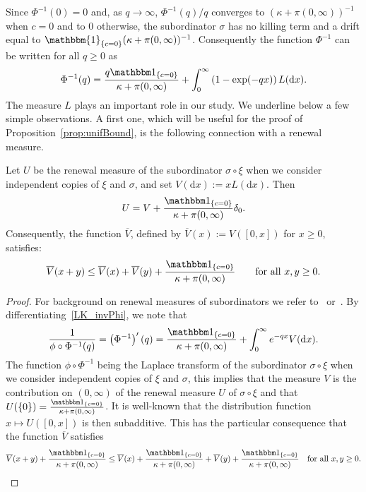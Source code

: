 \documentclass[AHL,Unicode,longabstracts,published]{cedram}
\newcommand{\dd}{\mathrm{d}}
\newcommand{\ind}[1]{\mathbbm{1}_{\left\{#1\right\}}}
\renewcommand{\bar}[1]{\overline{#1}}
\begin{document}
Since $\Phi^{-1}(0)=0$ and, as $q\rightarrow \infty$, $\Phi^{-1}(q)/q$ converges to $(\kappa+\pi(0,\infty))^{-1}$ when $c=0$ and to $0$ otherwise, the subordinator $\sigma$ has no killing term and a drift equal to $\ind{c=0}(\kappa+\pi(0,\infty))^{-1}$. Consequently the function $\Phi^{-1}$ can be written for all $q\geq 0$ as
\begin{equation}\label{LK_invPhi}
\Phi^{-1}(q)=\frac{q \mathbbm 1_{\{c=0\}}}{\kappa+\pi(0,\infty)}+\int_0^{\infty} \left(1-\exp(-qx)\right)L(\dd x).
\end{equation}
The measure $L$ plays an important role in our study. We underline below a few simple observations. A first one, which will be useful for the proof of Proposition~\ref{prop:unifBound}, is the following connection with a renewal measure.


\begin{lemm}\label{lem:renew}
Let $U$ be the renewal measure of the subordinator $\sigma \circ \xi$ when we consider independent copies of $\xi$ and $\sigma$, and set $V(\dd x):=xL(\dd x)$. Then
\[
U=V + \frac{\mathbbm 1_{\{c=0\}}}{\kappa+\pi(0,\infty)} \delta_0.
\]
Consequently, the function $\bar V$, defined by $\bar V(x):=V([0,x])$ for $x \geq 0$, satisfies:
\[
\bar V(x+y)\leq \bar V(x)+ \bar V(y) + \frac{\mathbbm 1_{\{c=0\}}}{\kappa+\pi(0,\infty)} \qquad \text{for all } x,y \geq 0.
\]
\end{lemm}

\begin{proof}
For background on renewal measures of subordinators we refer to~\cite[Chapter~3]{BLevy} or~\cite[Chapter~5]{KypFluctu}. By differentiating~\eqref{LK_invPhi}, we note that
\[
\frac{1}{\phi \circ \Phi^{-1}(q)}=\left(\Phi^{-1}\right)'(q)=\frac{\mathbbm 1_{\{c=0\}}}{\kappa+\pi(0,\infty)}+ \int_0^{\infty} e^{-qx} V(\dd x).
\]
The function $\phi \circ \Phi^{-1}$ being the Laplace transform of the subordinator $\sigma \circ \xi$ when we consider independent copies of $\xi$ and $\sigma$, this implies that the measure $V$ is the contribution on $(0,\infty)$ of the renewal measure $U$ of $\sigma \circ \xi$ and that $U(\{0\})=\frac{\mathbbm 1_{\{c=0\}}}{\kappa+\pi(0,\infty)}$. It is well-known that the distribution function $x \mapsto U([0,x])$ is then subadditive. This has the particular consequence that the function $\bar V$ satisfies
\[
\bar V(x+y)+ \frac{\mathbbm 1_{\{c=0\}}}{\kappa+\pi(0,\infty)} \leq \bar V(x)+ \frac{\mathbbm 1_{\{c=0\}}}{\kappa+\pi(0,\infty)}+ \bar V(y) + \frac{\mathbbm 1_{\{c=0\}}}{\kappa+\pi(0,\infty)} \quad \text{for all } x,y \geq 0. \qedhere
\]
\end{proof}
\end{document}
